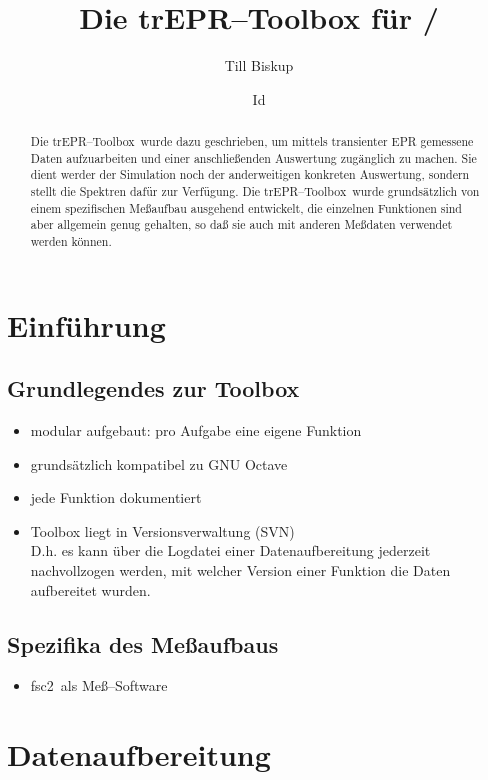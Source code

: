 \documentclass[a4paper]{refart}
\title{Die trEPR--Toolbox für \matlab/\octave}
\author{Till Biskup}
\date{$ $Id$ $}
\newcommand{\octave}{\textsf{GNU Octave}}
\newcommand{\toolbox}{\textsf{trEPR--Toolbox}}
\newcommand{\fsczwei}{\textsf{fsc2}}
\begin{document}
 
\maketitle

\begin{abstract}
  Die \toolbox\ wurde dazu geschrieben, um mittels transienter EPR gemessene
  Daten aufzuarbeiten und einer anschließenden Auswertung zugänglich zu machen.
  Sie dient werder der Simulation noch der anderweitigen konkreten Auswertung,
  sondern stellt die Spektren dafür zur Verfügung. Die \toolbox\ wurde
  grundsätzlich von einem spezifischen Meßaufbau ausgehend entwickelt, die
  einzelnen Funktionen sind aber allgemein genug gehalten, so daß sie auch mit
  anderen Meßdaten verwendet werden können.
\end{abstract}


\section{Einführung}

\subsection{Grundlegendes zur Toolbox}

\begin{itemize}
  \item modular aufgebaut: pro Aufgabe eine eigene Funktion
  \item grundsätzlich kompatibel zu \octave
  \item jede Funktion dokumentiert
  \item Toolbox liegt in Versionsverwaltung (SVN)\\ D.h. es kann über die
  Logdatei einer Datenaufbereitung jederzeit nachvollzogen werden, mit welcher
  Version einer Funktion die Daten aufbereitet wurden.
\end{itemize}


\subsection{Spezifika des Meßaufbaus}

\begin{itemize}
  \item \fsczwei\ als Meß--Software
\end{itemize}


\section{Datenaufbereitung}
\end{document}
